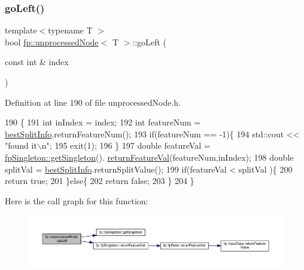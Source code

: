 \subsubsection{\texorpdfstring{go\+Left()}{goLeft()}\hspace{0.1cm}{\footnotesize\ttfamily [1/2]}}
{\footnotesize\ttfamily template$<$typename T $>$ \\
bool \hyperlink{classfp_1_1unprocessedNode}{fp\+::unprocessed\+Node}$<$ T $>$\+::go\+Left (\begin{DoxyParamCaption}\item[{const int \&}]{index }\end{DoxyParamCaption})\hspace{0.3cm}{\ttfamily [inline]}}



Definition at line 190 of file unprocessed\+Node.\+h.


\begin{DoxyCode}
190                                     \{
191     \textcolor{keywordtype}{int} inIndex = index;
192     \textcolor{keywordtype}{int} featureNum = \hyperlink{classfp_1_1unprocessedNode_ae60e5f84c9a80537cb84dfd17e70e893}{bestSplitInfo}.returnFeatureNum();
193     \textcolor{keywordflow}{if}(featureNum == -1)\{
194         std::cout << \textcolor{stringliteral}{"found it\(\backslash\)n"};
195         exit(1);
196     \}
197     \textcolor{keywordtype}{double} featureVal = \hyperlink{classfp_1_1fpSingleton_a8bdae77b68521003e3fc630edec2e240}{fpSingleton::getSingleton}().
      \hyperlink{classfp_1_1fpSingleton_aacc2eb894a219e2fe234743b51fa1a76}{returnFeatureVal}(featureNum,inIndex);
198         \textcolor{keywordtype}{double} splitVal = \hyperlink{classfp_1_1unprocessedNode_ae60e5f84c9a80537cb84dfd17e70e893}{bestSplitInfo}.returnSplitValue();
199                     \textcolor{keywordflow}{if}(featureVal < splitVal )\{
200                         \textcolor{keywordflow}{return} \textcolor{keyword}{true};
201                     \}\textcolor{keywordflow}{else}\{
202                         \textcolor{keywordflow}{return} \textcolor{keyword}{false};
203                     \}
204                 \}
\end{DoxyCode}
Here is the call graph for this function\+:
\nopagebreak
\begin{figure}[H]
\begin{center}
\leavevmode
\includegraphics[width=350pt]{classfp_1_1unprocessedNode_ad4ffdb4f4b91d6d21f8954f3c80a3617_cgraph}
\end{center}
\end{figure}
\mbox{\label{classfp_1_1unprocessedNode_ad4ffdb4f4b91d6d21f8954f3c80a3617}} 
